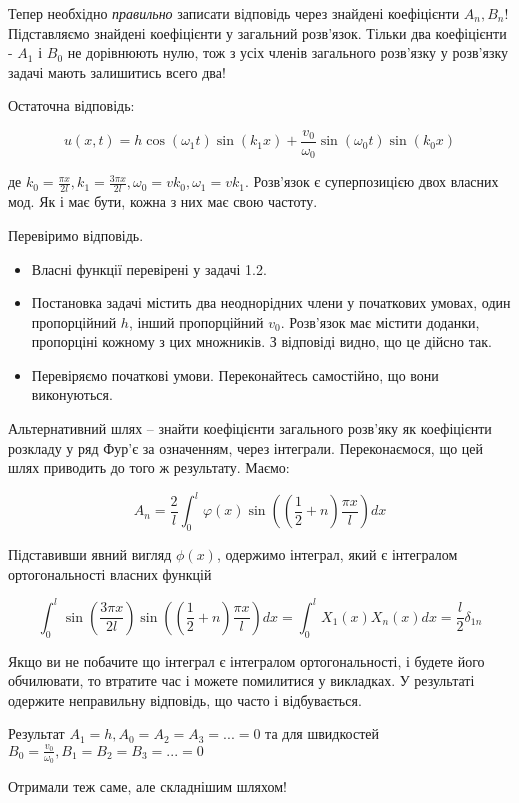 Тепер необхідно\textit{ правильно} записати відповідь через знайдені коефіцієнти $A_n, B_n$! Підставляємо знайдені коефіцієнти у загальний розв'язок. Тільки два коефіцієнти - $A_1$ і $B_0$ не дорівнюють нулю, тож з усіх членів загального розв'язку у розв'язку задачі мають залишитись всего два!

Остаточна відповідь:

\begin{equation}
    u (x,t) = h \cos (\omega_1 t) \sin (k_1 x) + \frac{v_0}{\omega_0} \sin (\omega_0 t) \sin (k_0 x)
\end{equation}

де $k_0 = \frac{\pi x}{2 l}, k_1 = \frac{3 \pi x}{2 l}, \omega_0 = v k_0, \omega_1 = v k_1 $. Розв'язок є суперпозицією двох власних мод. Як і має бути, кожна з них має свою частоту.

Перевіримо відповідь.

\begin{itemize}
    \item Власні функції перевірені у задачі 1.2.
    \item Постановка задачі містить два неоднорідних члени у початкових умовах, один пропорційний $h$, інший пропорційний $v_0$. Розв'язок має містити доданки, пропорціні кожному з цих множників. З відповіді видно, що це дійсно так.
    \item Перевіряємо початкові умови. Переконайтесь самостійно, що вони виконуються.

\end{itemize}

Альтернативний шлях -- знайти коефіцієнти загального розв'яку як коефіцієнти розкладу у ряд Фур'є за означенням, через інтеграли. Переконаємося, що цей шлях приводить до того ж результату. Маємо:

\begin{equation}
A_n = \frac{2}{l} \int_{0}^{l} \varphi (x)  \sin \left( (\frac{1}{2} + n) \frac{\pi x}{l} \right) dx    
\end{equation}


Підставивши явний вигляд $\phi(x)$, одержимо інтеграл, який є інтегралом ортогональності власних функцій 

\begin{equation}
    \int^{l}_0 \sin \left( \frac{3 \pi x}{2 l} \right) \sin \left( \left(\frac{1}{2} + n \right) \frac{\pi x}{l} \right) dx = \int^{l}_0 X_1 (x) X_n (x) dx = \frac{l}{2}\delta_{1n}
\end{equation}

Якщо ви не побачите що інтеграл є інтегралом ортогональності, і будете його обчилювати, то втратите час і можете помилитися у викладках. У результаті одержите неправильну відповідь, що часто і відбувається.

Результат $A_1 = h, A_0 = A_2 = A_3 = ... = 0$ та для швидкостей $B_0 = \frac{v_0}{\omega_0}, B_1 = B_2 = B_3 = ... = 0$

Отримали теж саме, але складнішим шляхом!


%